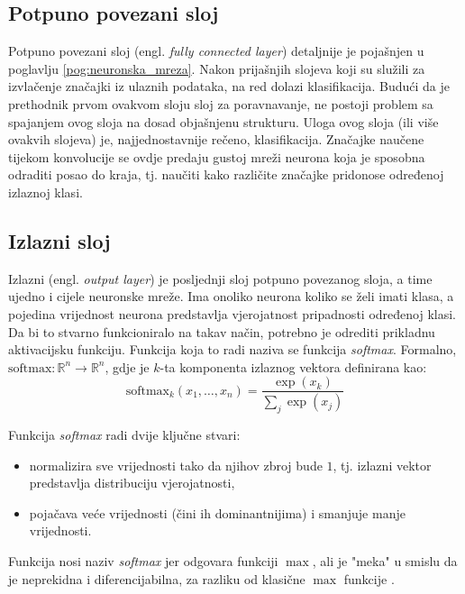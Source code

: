 \subsection{Potpuno povezani sloj}
\label{sub:dense}
Potpuno povezani sloj (engl. \textit{fully connected layer}) detaljnije je pojašnjen u poglavlju
\ref{pog:neuronska_mreza}. Nakon prijašnjih slojeva koji su služili za izvlačenje
značajki iz ulaznih podataka, na red dolazi klasifikacija. Budući da je prethodnik
prvom ovakvom sloju sloj za poravnavanje, ne postoji problem sa spajanjem ovog sloja na dosad
objašnjenu strukturu. Uloga ovog sloja (ili više ovakvih slojeva) je, najjednostavnije
rečeno, klasifikacija. Značajke naučene tijekom konvolucije se ovdje predaju gustoj mreži
neurona koja je sposobna odraditi posao do kraja, tj. naučiti kako različite značajke
pridonose određenoj izlaznoj klasi.

\subsection{Izlazni sloj}
\label{sub:output}
Izlazni (engl. \textit{output layer}) je posljednji sloj potpuno povezanog sloja, a time ujedno i cijele
neuronske mreže. Ima onoliko neurona koliko se želi imati klasa, a pojedina vrijednost
neurona predstavlja vjerojatnost pripadnosti određenoj klasi. Da bi to stvarno funkcioniralo na takav
način, potrebno je odrediti prikladnu aktivacijsku funkciju. Funkcija koja to radi 
naziva se funkcija \textit{softmax}. 
Formalno, \( \text{softmax} : \mathbb{R}^n \to \mathbb{R}^n \),
gdje je \( k \)-ta komponenta izlaznog vektora definirana kao:
\begin{equation}
\text{softmax}_k(x_1, \dots, x_n) = \frac{\exp(x_k)}{\sum_{j} \exp(x_j)}
\end{equation}

Funkcija \textit{softmax} radi dvije ključne stvari:
\begin{itemize}
    \item normalizira sve vrijednosti tako da njihov zbroj bude \( 1 \), tj. izlazni vektor 
        predstavlja distribuciju vjerojatnosti,
    \item pojačava veće vrijednosti (čini ih dominantnijima) i smanjuje manje vrijednosti.
\end{itemize}

Funkcija nosi naziv \textit{softmax} jer odgovara funkciji \( \max \), ali je "meka" u smislu
da je neprekidna i diferencijabilna, za razliku od klasične \( \max \) funkcije 
\cite{snajder2023logreg}.

